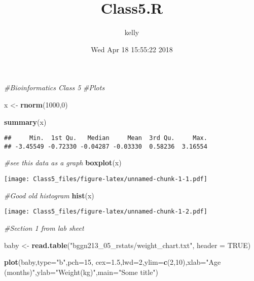 \documentclass[]{article}
\title{Class5.R}
\author{kelly}
\date{Wed Apr 18 15:55:22 2018}
\newenvironment{Shaded}{\begin{snugshade}}{\end{snugshade}}
\newcommand{\KeywordTok}[1]{\textcolor[rgb]{0.13,0.29,0.53}{\textbf{#1}}}
\newcommand{\DataTypeTok}[1]{\textcolor[rgb]{0.13,0.29,0.53}{#1}}
\newcommand{\DecValTok}[1]{\textcolor[rgb]{0.00,0.00,0.81}{#1}}
\newcommand{\FloatTok}[1]{\textcolor[rgb]{0.00,0.00,0.81}{#1}}
\newcommand{\StringTok}[1]{\textcolor[rgb]{0.31,0.60,0.02}{#1}}
\newcommand{\CommentTok}[1]{\textcolor[rgb]{0.56,0.35,0.01}{\textit{#1}}}
\newcommand{\OtherTok}[1]{\textcolor[rgb]{0.56,0.35,0.01}{#1}}
\newcommand{\NormalTok}[1]{#1}
\begin{document}
\maketitle

\begin{Shaded}
\begin{Highlighting}[]
\CommentTok{#Bioinformatics Class 5}
\CommentTok{#Plots}

\NormalTok{x <-}\StringTok{ }\KeywordTok{rnorm}\NormalTok{(}\DecValTok{1000}\NormalTok{,}\DecValTok{0}\NormalTok{)}

\KeywordTok{summary}\NormalTok{(x)}
\end{Highlighting}
\end{Shaded}

\begin{verbatim}
##     Min.  1st Qu.   Median     Mean  3rd Qu.     Max. 
## -3.45549 -0.72330 -0.04287 -0.03330  0.58236  3.16554
\end{verbatim}

\begin{Shaded}
\begin{Highlighting}[]
\CommentTok{#see this data as a graph}
\KeywordTok{boxplot}\NormalTok{(x)}
\end{Highlighting}
\end{Shaded}

\texttt{[image: Class5\_files/figure-latex/unnamed-chunk-1-1.pdf]}

\begin{Shaded}
\begin{Highlighting}[]
\CommentTok{#Good old histogram}
\KeywordTok{hist}\NormalTok{(x)}
\end{Highlighting}
\end{Shaded}

\texttt{[image: Class5\_files/figure-latex/unnamed-chunk-1-2.pdf]}

\begin{Shaded}
\begin{Highlighting}[]
\CommentTok{#Section 1 from lab sheet}

\NormalTok{baby <-}\StringTok{ }\KeywordTok{read.table}\NormalTok{(}\StringTok{"bggn213_05_rstats/weight_chart.txt"}\NormalTok{, }\DataTypeTok{header =} \OtherTok{TRUE}\NormalTok{)}

\KeywordTok{plot}\NormalTok{(baby,}\DataTypeTok{type=}\StringTok{"b"}\NormalTok{,}\DataTypeTok{pch=}\DecValTok{15}\NormalTok{, }\DataTypeTok{cex=}\FloatTok{1.5}\NormalTok{,}\DataTypeTok{lwd=}\DecValTok{2}\NormalTok{,}\DataTypeTok{ylim=}\KeywordTok{c}\NormalTok{(}\DecValTok{2}\NormalTok{,}\DecValTok{10}\NormalTok{),}\DataTypeTok{xlab=}\StringTok{"Age (months)"}\NormalTok{,}\DataTypeTok{ylab=}\StringTok{"Weight(kg)"}\NormalTok{,}\DataTypeTok{main=}\StringTok{"Some title"}\NormalTok{)}
\end{Highlighting}
\end{Shaded}
\end{document}
